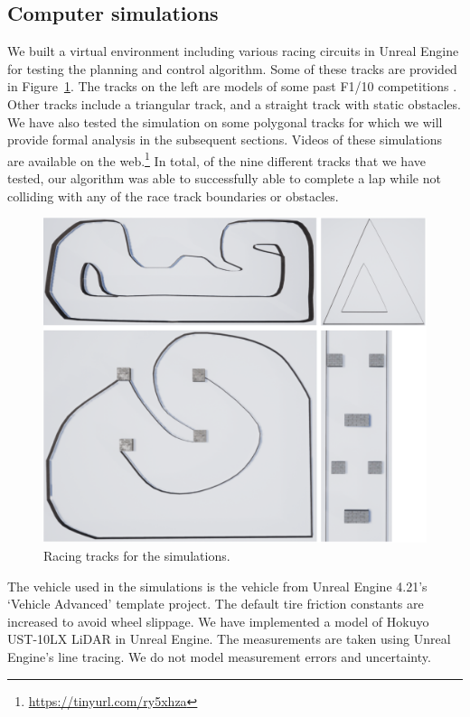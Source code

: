 \subsection{Computer simulations}

We built a virtual environment including various racing circuits in Unreal Engine for testing the planning and control algorithm.
%
Some of these tracks are provided in Figure~\ref{fig:simulation_tracks}.
%
The tracks on the left are models of some past  F1/10 competitions \cite{f1tenth}.
%
Other tracks include a triangular track, and a straight track with static obstacles.
%
We have also tested the simulation on some polygonal tracks for which we will provide formal analysis in the subsequent sections.
%
Videos of these simulations are available on the web.\footnote{\url{https://tinyurl.com/ry5xhza}}
%
In total, of the nine different tracks that we have tested, our algorithm was able to successfully able to complete a lap while not colliding with any of the race track boundaries or obstacles.

\begin{figure}[!t]
\centering
\includegraphics[width=0.8\columnwidth]{Figures/sim-tracks.png}
\caption{Racing tracks for the simulations.}
\label{fig:simulation_tracks}
\end{figure}

The vehicle used in the simulations is the vehicle from Unreal Engine 4.21's `Vehicle Advanced' template project.
%
The default tire friction constants are increased to avoid wheel slippage.
%
We have implemented a model of Hokuyo UST-10LX LiDAR in Unreal Engine.
%
The measurements are taken using Unreal Engine's line tracing.
%
We do not model measurement errors and uncertainty.


